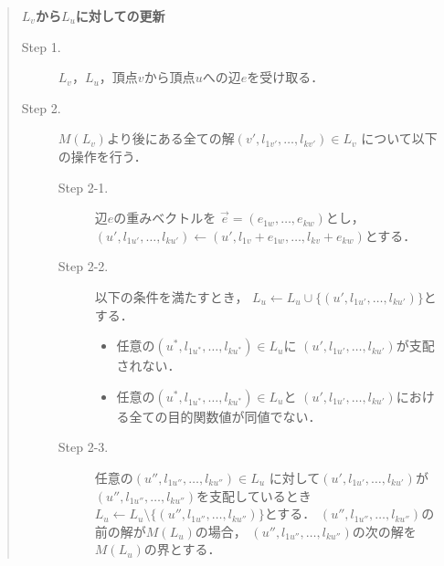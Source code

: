 \documentclass[12pt]{optlab-bachelor}
\begin{document}
\begin{quote}
  \textbf{$L_v$から$L_u$に対しての更新}
  \begin{description}
    \item[Step 1.] $L_v$，$L_u$，頂点$v$から頂点$u$への辺$e$を受け取る．
    \item[Step 2.] $M(L_v)$より後にある全ての解$(v',l_{1v'},\ldots,l_{kv'}) \in L_v$
    について以下の操作を行う．
    \begin{description}
      \item[Step 2-1.] 辺$e$の重みベクトルを
      $\vec{e} = (e_{1w},\ldots,e_{kw})$とし，
      $(u',l_{1u'},\ldots,l_{ku'}) \leftarrow
      (u',l_{1v}+e_{1w},\ldots,l_{kv}+e_{kw})$とする．
      \item[Step 2-2.] 以下の条件を満たすとき，
      $L_u \leftarrow L_u \cup \{(u',l_{1u'},\ldots,l_{ku'})\}$とする．
      \begin{itemize}
        \item 任意の$(u^*,l_{1u^*},\ldots,l_{ku^*})\in L_u$に
        $(u',l_{1u'},\ldots,l_{ku'})$が支配されない．
        \item 任意の$(u^*,l_{1u^*},\ldots,l_{ku^*}) \in L_u$と
        $(u',l_{1u'},\ldots,l_{ku'})$における全ての目的関数値が同値でない．
      \end{itemize}
      \item[Step 2-3.] 任意の$(u'',l_{1u''},\ldots,l_{ku''})\in L_u$
      に対して$(u',l_{1u'},\ldots,l_{ku'})$が
      $(u'',l_{1u''},\ldots,l_{ku''})$を支配しているとき
      $L_u \leftarrow L_u \setminus \{(u'',l_{1u''},\ldots,l_{ku''})\}$とする．
      $(u'',l_{1u''},\ldots,l_{ku''})$の前の解が$M(L_u)$の場合，
      $(u'',l_{1u''},\ldots,l_{ku''})$の次の解を$M(L_u)$の界とする．
    \end{description}
  \end{description}
\end{quote}

%
\end{document}
